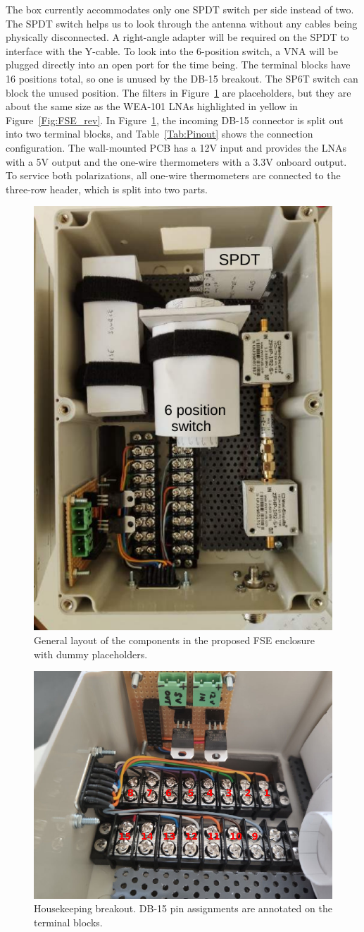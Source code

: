 The box currently accommodates only one SPDT switch per side instead of two. The SPDT switch helps us to look through the antenna without any cables being physically disconnected. A right-angle adapter will be required on the SPDT to interface with the Y-cable. To look into the 6-position switch, a VNA will be plugged directly into an open port for the time being. The terminal blocks have 16 positions total, so one is unused by the DB-15 breakout. The SP6T switch can block the unused position. The filters in Figure~\ref{Fig:FSE_archi} are placeholders, but they are about the same size as the WEA-101 LNAs highlighted in yellow in Figure~\ref{Fig:FSE_rev}. In Figure~\ref{Fig:FSE_archi}, the incoming DB-15 connector is split out into two terminal blocks, and Table~\ref{Tab:Pinout} shows the connection configuration. The wall-mounted PCB has a 12V input and provides the LNAs with a 5V output and the one-wire thermometers with a 3.3V onboard output. To service both polarizations, all one-wire thermometers are connected to the three-row header, which is split into two parts.

\begin{figure}
	\centering
	\includegraphics[width=0.5\linewidth]{Figures/FSE_archi}
	\caption{General layout of the components in the proposed FSE enclosure with dummy placeholders.}
	\label{Fig:FSE_archi}
\end{figure}

\begin{figure}
	\centering
	\includegraphics[width=0.7\linewidth]{Figures/Terminal}
	\caption{Housekeeping breakout. DB-15 pin assignments are annotated on the terminal blocks.}
	\label{Fig:Terminal}
\end{figure}

